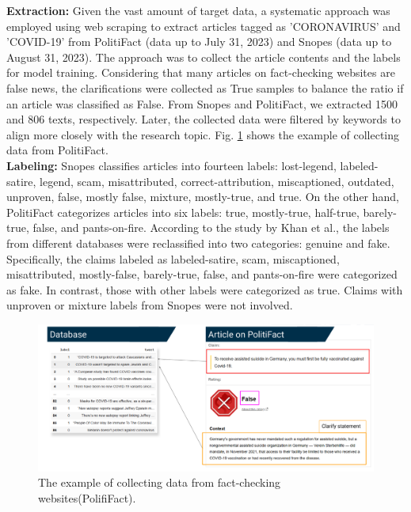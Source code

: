\textbf{Extraction:}
Given the vast amount of target data, a systematic approach was employed using web scraping to extract articles tagged as  'CORONAVIRUS' and 'COVID-19' from PolitiFact (data up to July 31, 2023) and Snopes (data up to August 31, 2023). The approach was to collect the article contents and the labels for model training. Considering that many articles on fact-checking websites are false news, the clarifications were collected as True samples to balance the ratio if an article was classified as False. From Snopes and PolitiFact, we extracted 1500 and 806 texts, respectively. Later, the collected data were filtered by keywords to align more closely with the research topic. Fig. \ref{fig:fack-checking websites} shows the example of collecting data from PolitiFact.\\

\textbf{Labeling:}
Snopes classifies articles into fourteen labels: lost-legend, labeled-satire, legend, scam, misattributed, correct-attribution, miscaptioned, outdated, unproven, false, mostly false, mixture, mostly-true, and true. On the other hand, PolitiFact categorizes articles into six labels: true, mostly-true, half-true, barely-true, false, and pants-on-fire. According to the study by Khan et al.\cite{b15}, the labels from different databases were reclassified into two categories: genuine and fake. Specifically, the claims labeled as labeled-satire, scam, miscaptioned, misattributed, mostly-false, barely-true, false, and pants-on-fire were categorized as fake. In contrast, those with other labels were categorized as true. Claims with unproven or mixture labels from Snopes were not involved\cite{b11}. 

\begin{figure}
  \centering
  \includegraphics[width=1\columnwidth]{img/fack-checking websites.png}
  \caption{The example of collecting data from fact-checking websites(PolifiFact). } 
  \vspace{-0.4cm}
  \label{fig:fack-checking websites}
\end{figure}

